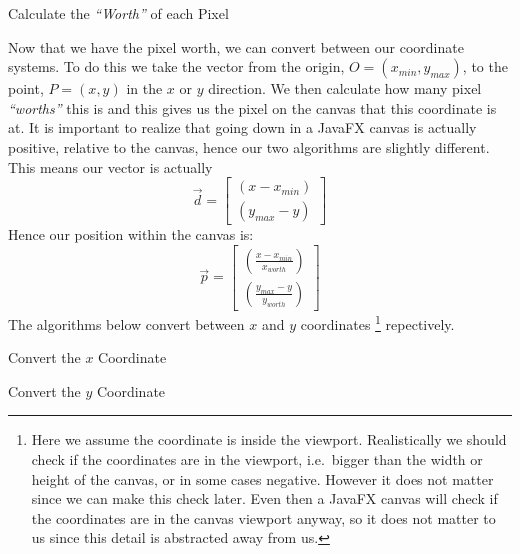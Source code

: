 \documentclass[../../../../../../../main.tex]{subfiles}
\begin{document}
\begin{algorithm}[H]
\DontPrintSemicolon
\caption{Calculate the \textit{``Worth''} of each Pixel}
\end{algorithm}
Now that we have the pixel worth, we can convert between our coordinate systems. To do this we take the vector from the origin, $O=(x_{min},y_{max})$, to the point, $P=(x,y)$ in the $x$ or $y$ direction. We then calculate how many pixel \textit{``worths''} this is and this gives us the pixel on the canvas that this coordinate is at.
It is important to realize that going down in a JavaFX canvas is actually positive, relative to the canvas, hence our two algorithms are slightly different. This means our vector is actually 
\[\vec{d} = 
\begin{bmatrix}
(x-x_{min}) \\
(y_{max}-y)
\end{bmatrix}\]
Hence our position within the canvas is:
\[\vec{p} =
\begin{bmatrix}
\left(\frac{x-x_{min}}{x_{worth}}\right) \\
\left(\frac{y_{max}-y}{y_{worth}}\right)
\end{bmatrix} 
\]
The algorithms below convert between $x$ and $y$ coordinates
\footnote{Here we assume the coordinate is inside the viewport. Realistically we should check if the coordinates are in the viewport, i.e.\ bigger than the width or height of the canvas, or in some cases negative. However it does not matter since we can make this check later. Even then a JavaFX canvas will check if the coordinates are in the canvas viewport anyway, so it does not matter to us since this detail is abstracted away from us.}
 repectively. 

\begin{algorithm}
\DontPrintSemicolon
\caption{Convert the $x$ Coordinate}
\end{algorithm}
\begin{algorithm}
\DontPrintSemicolon
\caption{Convert the $y$ Coordinate}
\end{algorithm}
\newpage 
\end{document}

